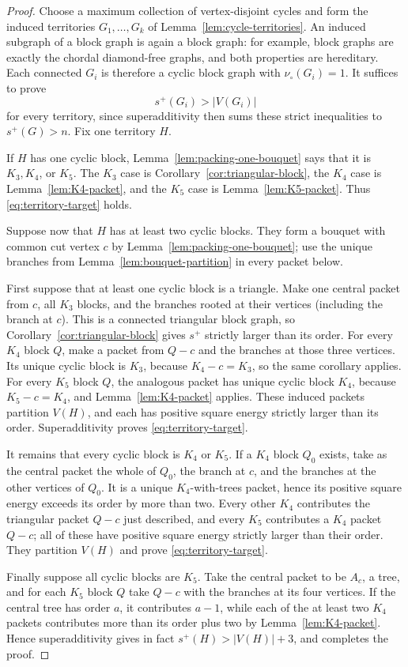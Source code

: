 \documentclass[11pt]{article}
\theoremstyle{definition}
\theoremstyle{remark}
\newcommand{\vp}{\nu_{\circ}}
\begin{document}
\begin{proof}
Choose a maximum collection of vertex-disjoint cycles and form the induced
territories $G_1,\ldots,G_k$ of Lemma~\ref{lem:cycle-territories}.  An induced
subgraph of a block graph is again a block graph: for example, block graphs
are exactly the chordal diamond-free graphs, and both properties are
hereditary.  Each connected $G_i$ is therefore a cyclic block graph with
$\vp(G_i)=1$.  It suffices to prove
\begin{equation}\label{eq:territory-target}
 s^+(G_i)>|V(G_i)|
\end{equation}
for every territory, since superadditivity then sums these strict inequalities
to $s^+(G)>n$.  Fix one territory $H$.

If $H$ has one cyclic block, Lemma~\ref{lem:packing-one-bouquet} says that it
is $K_3,K_4$, or $K_5$.  The $K_3$ case is
Corollary~\ref{cor:triangular-block}, the $K_4$ case is
Lemma~\ref{lem:K4-packet}, and the $K_5$ case is
Lemma~\ref{lem:K5-packet}.  Thus \eqref{eq:territory-target} holds.

Suppose now that $H$ has at least two cyclic blocks.  They form a bouquet
with common cut vertex $c$ by Lemma~\ref{lem:packing-one-bouquet}; use the
unique branches from Lemma~\ref{lem:bouquet-partition} in every packet below.

First suppose that at least one cyclic block is a triangle.  Make one central
packet from $c$, all $K_3$ blocks, and the branches rooted at their vertices
(including the branch at $c$).  This is a connected triangular block graph,
so Corollary~\ref{cor:triangular-block} gives $s^+$ strictly larger than its
order.  For every $K_4$ block $Q$, make a packet from $Q-c$ and the branches
at those three vertices.  Its unique cyclic block is $K_3$, because
$K_4-c=K_3$, so the same corollary applies.  For every $K_5$ block $Q$, the
analogous packet has unique cyclic block $K_4$, because $K_5-c=K_4$, and
Lemma~\ref{lem:K4-packet} applies.  These induced packets partition $V(H)$,
and each has positive square energy strictly larger than its order.
Superadditivity proves \eqref{eq:territory-target}.

It remains that every cyclic block is $K_4$ or $K_5$.  If a $K_4$ block
$Q_0$ exists, take as the central packet the whole of $Q_0$, the branch at
$c$, and the branches at the other vertices of $Q_0$.  It is a unique
$K_4$-with-trees packet, hence its positive square energy exceeds its order
by more than two.  Every other $K_4$ contributes the triangular packet
$Q-c$ just described, and every $K_5$ contributes a $K_4$ packet $Q-c$;
all of these have positive square energy strictly larger than their order.
They partition $V(H)$ and prove \eqref{eq:territory-target}.

Finally suppose all cyclic blocks are $K_5$.  Take the central packet to be
$A_c$, a tree, and for each $K_5$ block $Q$ take $Q-c$ with the branches at
its four vertices.  If the central tree has order $a$, it contributes
$a-1$, while each of the at least two $K_4$ packets contributes more than
its order plus two by Lemma~\ref{lem:K4-packet}.  Hence superadditivity gives
in fact $s^+(H)>|V(H)|+3$, and completes the proof.
\end{proof}
\end{document}
